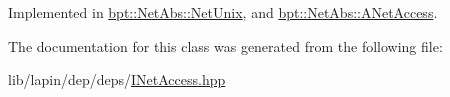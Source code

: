 Implemented in \hyperlink{classbpt_1_1_net_abs_1_1_net_unix_a225d2b22fa769f6e3f09d287586289b1}{bpt\-::\-Net\-Abs\-::\-Net\-Unix}, and \hyperlink{classbpt_1_1_net_abs_1_1_a_net_access_aa9e29deb2022f7eb601554990a8d452a}{bpt\-::\-Net\-Abs\-::\-A\-Net\-Access}.



The documentation for this class was generated from the following file\-:\begin{DoxyCompactItemize}
\item 
lib/lapin/dep/deps/\hyperlink{_i_net_access_8hpp}{I\-Net\-Access.\-hpp}\end{DoxyCompactItemize}
